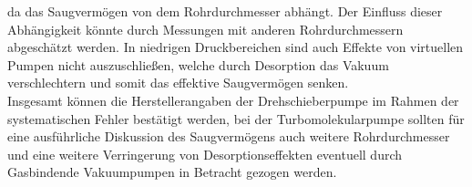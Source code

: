 da das Saugvermögen von dem Rohrdurchmesser abhängt. Der Einfluss dieser Abhängigkeit könnte 
durch Messungen mit anderen Rohrdurchmessern abgeschätzt werden. In niedrigen Druckbereichen sind auch 
Effekte von virtuellen Pumpen nicht auszuschließen, welche durch Desorption das Vakuum verschlechtern 
und somit das effektive Saugvermögen senken. 
\\
Insgesamt können die Herstellerangaben der Drehschieberpumpe im Rahmen der systematischen Fehler 
bestätigt werden, bei der Turbomolekularpumpe sollten für eine ausführliche Diskussion des 
Saugvermögens auch weitere Rohrdurchmesser und eine weitere Verringerung von Desorptionseffekten 
eventuell durch Gasbindende Vakuumpumpen in Betracht gezogen werden.
\newpage